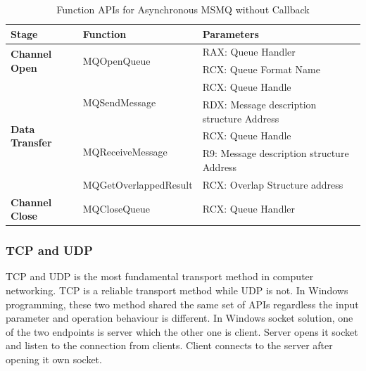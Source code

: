     \begin{table}[H]
        \centering
        \caption{Function APIs for Asynchronous MSMQ without Callback}
        \label{msmqasynfunctions}
        \begin{tabular}{|l|l|l|}
            \hline
             \textbf{Stage} & \textbf{Function}& \textbf{Parameters}  \\
             \hline
             \multirow{2}{*}{{\textbf{Channel Open}}}
             &\multirow{2}{*}{{MQOpenQueue}} &  RAX: Queue Handler\\
              \cline{3-3} 
             & &  RCX: Queue Format Name\\
            \hline
             \multirow{5}{*}{{\textbf{Data Transfer}}}
             &\multirow{2}{*}{MQSendMessage} &  RCX: Queue Handle \\
              \cline{3-3} 
             &&  RDX: Message description structure Address \\
            \cline{2-3}
             & \multirow{2}{*}{MQReceiveMessage}&  RCX: Queue Handle \\
              \cline{3-3} 
              &&  R9: Message description structure Address \\
                          \cline{2-3}
                          
              & MQGetOverlappedResult &  RCX: Overlap Structure address  \\
            \hline
            \textbf{Channel Close} &MQCloseQueue & RCX: Queue Handler \\
            \hline
        \end{tabular}
    \end{table}
    
\subsubsection{TCP and UDP}
TCP and UDP is the most fundamental transport method in computer networking. TCP is a reliable transport method while UDP is not. In Windows programming, these two method shared the same set of APIs regardless the input parameter and operation behaviour is different. In Windows socket solution, one of the two endpoints is server which the other one is client. Server opens it socket and listen to the connection from clients. Client connects to the server after opening it own socket. 

